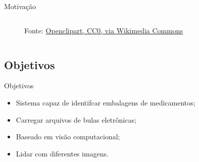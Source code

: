 \begin{frame}{Motivação}
\begin{columns}
\begin{column}{0.5\textwidth}
\begin{figure}
                \caption*{Fonte: \href{https://commons.wikimedia.org/wiki/File:Snellen_chart_by_Openclipart.svg}{Openclipart, CC0, via Wikimedia Commons}}
            \end{figure}
        \end{column}
    \end{columns}
\end{frame}

\subsection{Objetivos}
\begin{frame}{Objetivos}
    \begin{itemize}%
        \item Sistema capaz de identifcar embalagens de medicamentos;
        \item Carregar arquivos de bulas eletrônicas;
        \item Baseado em visão computacional;
        \item Lidar com diferentes imagens.
    \end{itemize}
\end{frame}
